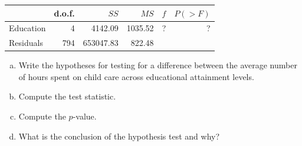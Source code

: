 \documentclass[11pt,twoside]{article}
\newcommand{\pts}[1]{\marginpar{ \small\hspace{0pt} \textit{[#1]} } }
\numberwithin{equation}{section}
\newcommand{\?}{\stackrel{?}{=}}
\begin{document}
\begin{table}[h!]
	\centering
	\begin{tabular}{l r r r r r}\hline
		& d.o.f. & $SS$ & $MS$ & $f$ & $P(>F)$ \\ \hline
		Education & 4 & 4142.09 & 1035.52 & ?  & ?  \\
		Residuals & 794 & 653047.83 & 822.48 & &  \\\hline
	\end{tabular}
\end{table}
\begin{enumerate}[(a)]
	\item Write the hypotheses for testing for a difference between the average number of hours spent on child
	care across educational attainment levels. \pts{2}
	\vspace{20ex}
	\item Compute the test statistic. \pts{2}
		\vspace{20ex}
	\item Compute the $p$-value. \pts{2}
		\vspace{20ex}
	\item What is the conclusion of the hypothesis test and why? \pts{2}
		\vspace{20ex}
\end{enumerate}
\end{document}
